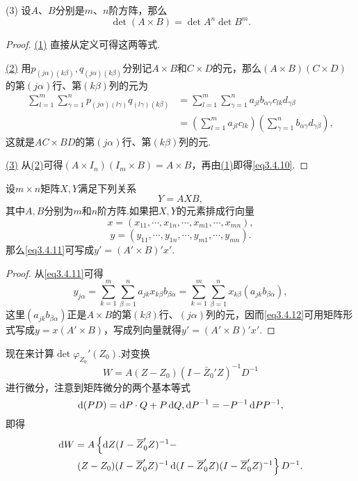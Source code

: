 (3)\hypertarget{3.4.3.1}{}
设$A$、$B$分别是$m$、$n$阶方阵，那么
\begin{equation}\label{eq3.4.10}
	\det(A\times B)=\det A^n\det B^m.
\end{equation}
\begin{proof}
	\hyperlink{3.4.3.1}{(1)}
	直接从定义可得这两等式.
	
	\hyperlink{3.4.3.1}{(2)}
	用$p_{(j\alpha)(k\beta)},q_{(j\alpha)(k\beta)}$分别记$A\times B$和$C\times D$的元，那么$(A\times B)(C\times D)$的第$(j\alpha)$行、第$(k\beta)$列的元为
	\begin{align*}
		\sum_{l=1}^{m}\sum_{\gamma=1}^{n}p_{(j\alpha)(l\gamma)}q_{(l\gamma)(k\beta)}
		&=\sum_{l=1}^{m}\sum_{\gamma=1}^{n}a_{jl}b_{\alpha\gamma}c_{lk}d_{\gamma\beta}\\
		&=\left(\sum_{l=1}^{m}a_{jl}c_{lk}\right)\left(\sum_{\gamma=1}^{n}b_{\alpha\gamma}d_{\gamma\beta}\right),
	\end{align*}
这就是$AC\times BD$的第$(j\alpha)$行、第$(k\beta)$列的元.
	
	\hyperlink{3.4.3.1}{(3)}
	从\hyperlink{3.4.3.1}{(2)}可得$(A\times I_n)(I_m\times B)=A\times B$，再由\hyperlink{3.4.3.1}{(1)}即得\eqref{eq3.4.10}.
\end{proof}
\begin{lemma}\label{lem3.4.6}
	设$m\times n$矩阵$X,Y$满足下列关系
	\begin{equation}\label{eq3.4.11}
		Y=AXB,
	\end{equation}
其中$A,B$分别为$m$和$n$阶方阵.如果把$X,Y$的元素排成行向量
\[x=(x_{11},\cdots,x_{1n},\cdots,x_{m1},\cdots,x_{mn}),\]
\[y=(y_{11},\cdots,y_{1n},\cdots,y_{m1},\cdots,y_{mn}).\]
那么\eqref{eq3.4.11}可写成$y'=(A'\times B)'x'$.
\end{lemma}
\begin{proof}
	从\eqref{eq3.4.11}可得
	\begin{equation}\label{eq3.4.12}
		y_{j\alpha}=\sum_{k=1}^{m}\sum_{\beta=1}^{n}a_{jk}x_{k\beta}b_{\beta\alpha}=\sum_{k=1}^{m}\sum_{\beta=1}^{n}x_{k\beta}(a_{jk}b_{\beta\alpha}),
	\end{equation}
这里$(a_{jk}b_{\beta\alpha})$正是$A\times B$的第$(k\beta)$行、$(j\alpha)$列的元，因而\eqref{eq3.4.12}可用矩阵形式写成$y=x(A'\times B)$，写成列向量就得$y'=(A'\times B)'x'$.
\end{proof}
现在来计算$\det\varphi_{Z_0}'(Z_0)$.对变换
\[W=A(Z-Z_0)(I-\bar{Z}_0'Z)^{-1}D^{-1}\]
进行微分，注意到矩阵微分的两个基本等式
\[\mathop{}\!\mathrm{d}(PD)=\mathop{}\!\mathrm{d} P\cdot Q+P\mathop{}\!\mathrm{d} Q,\mathop{}\!\mathrm{d} P^{-1}=-P^{-1}\mathop{}\!\mathrm{d} PP^{-1},\]
即得
\begin{align*}
	\mathop{}\!\mathrm{d} W
	&=A\left\{\mathop{}\!\mathrm{d} Z(I-{}\mkern1mu\overline{\mkern-1muZ}_0'Z)^{-1}-\right.\\
	&\left. (Z-Z_0)(I-{}\mkern1mu\overline{\mkern-1muZ}_0'Z)^{-1}\mathop{}\!\mathrm{d}(I-{}\mkern1mu\overline{\mkern-1muZ}_0'Z)(I-{}\mkern1mu\overline{\mkern-1muZ}_0'Z)^{-1}\right\}D^{-1}.
\end{align*}
